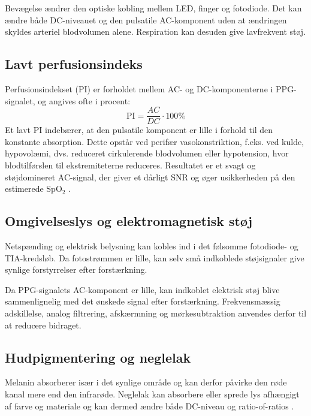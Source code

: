 Bevægelse ændrer den optiske kobling mellem LED, finger og fotodiode. Det kan ændre både DC-niveauet og den pulsatile AC-komponent uden at ændringen skyldes arteriel blodvolumen alene. Respiration kan desuden give lavfrekvent støj.
  
  \subsection{Lavt perfusionsindeks}

Perfusionsindekset (PI) er forholdet mellem AC- og DC-komponenterne i PPG-signalet, og angives ofte i procent:
\begin{equation}
    \text{PI} = \frac{AC}{DC} \cdot 100\%
    \label{eq:perfusion_index}
\end{equation}
Et lavt PI indebærer, at den pulsatile komponent er lille i forhold til den konstante absorption. Dette opstår ved perifær vasokonstriktion, f.eks. ved kulde, hypovolæmi, dvs. reduceret cirkulerende blodvolumen eller hypotension, hvor blodtilførslen til ekstremiteterne reduceres. Resultatet er et svagt og støjdomineret AC-signal, der giver et dårligt SNR og øger usikkerheden på den estimerede SpO$_2$ \cite{Webster1997,Ruberry2025}.

  \subsection{Omgivelseslys og elektromagnetisk støj}

Netspænding og elektrisk belysning kan kobles ind i det følsomme fotodiode- og TIA-kredsløb. Da fotostrømmen er lille, kan selv små indkoblede støjsignaler give synlige forstyrrelser efter forstærkning.

Da PPG-signalets AC-komponent er lille, kan indkoblet elektrisk støj blive sammenlignelig med det ønskede signal efter forstærkning. Frekvensmæssig adskillelse, analog filtrering, afskærmning og mørkesubtraktion anvendes derfor til at reducere bidraget.
  
  \subsection{Hudpigmentering og neglelak}

Melanin absorberer især i det synlige område og kan derfor påvirke den røde kanal mere end den infrarøde. Neglelak kan absorbere eller sprede lys afhængigt af farve og materiale og kan dermed ændre både DC-niveau og ratio-of-ratios \cite[s.~19]{Webster1997} \cite{Pologe2025}.

